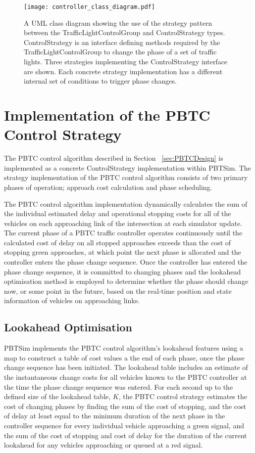 \begin{figure}[]
\centering
	\texttt{[image: controller\_class\_diagram.pdf]}
	\caption{ A UML class diagram showing the use of the strategy pattern between the TrafficLightControlGroup and ControlStrategy types. ControlStrategy is an interface defining methods required by the TrafficLightControlGroup to change the phase of a set of traffic lights. Three strategies implementing the ControlStrategy interface are shown. Each concrete strategy implementation has a different internal set of conditions to trigger phase changes. }
\label{controllerclassdiagram}
\end{figure}


\section{Implementation of the PBTC Control Strategy}

The PBTC control algorithm described in Section ~\ref{sec:PBTCDesign} is implemented as a concrete ControlStrategy implementation within PBTSim. The strategy implementation of the PBTC control algorithm consists of two primary phases of operation; approach cost calculation and phase scheduling. 

The PBTC control algorithm implementation dynamically calculates the sum of the individual estimated delay and operational stopping costs for all of the vehicles on each approaching link of the intersection at each simulator update. 
The current phase of a PBTC traffic controller operates continuously until the calculated cost of delay on all stopped approaches exceeds than the cost of stopping green approaches, at which point the next phase is allocated and the controller enters the phase change sequence. Once the controller has entered the phase change sequence, it is  committed to changing phases and the lookahead optimisation method is employed to determine whether the phase should change now, or some point in the future, based on the real-time position and state information of vehicles on approaching links. 

\subsection{Lookahead Optimisation}

PBTSim implements the PBTC control algorithm's lookahead features using a map to construct a table of cost values a the end of each phase, once the phase change sequence has been initiated. The lookahead table includes an estimate of the instantaneous change costs for all vehicles known to the PBTC controller at the time the phase change sequence was entered. For each second up to the defined size of the lookahead table, $K$, the PBTC control strategy estimates the cost of changing phases by finding the sum of the cost of stopping, and the cost of delay at least equal to the minimum duration of the next phase in the controller sequence for every individual vehicle approaching a green signal, and the sum of the cost of stopping and cost of delay for the duration of the current lookahead for any vehicles approaching or queued at a red signal. 


